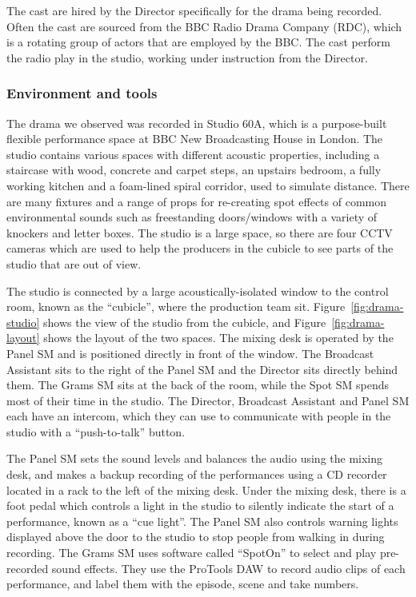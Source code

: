 The cast are hired by the Director specifically for the drama being recorded. Often the cast are sourced from the BBC
Radio Drama Company (RDC), which is a rotating group of actors that are employed by the BBC. The cast perform the
radio play in the studio, working under instruction from the Director.

\subsubsection{Environment and tools}
The drama we observed was recorded in Studio 60A, which is a purpose-built flexible performance space at BBC New
Broadcasting House in London. The studio contains various spaces with different acoustic properties, including a
staircase with wood, concrete and carpet steps, an upstairs bedroom, a fully working kitchen and a foam-lined spiral
corridor, used to simulate distance.  There are many fixtures and a range of props for re-creating spot effects of
common environmental sounds such as freestanding doors/windows with a variety of knockers and letter boxes. The studio
is a large space, so there are four CCTV cameras which are used to help the producers in the cubicle to see parts of
the studio that are out of view. 

The studio is connected by a large acoustically-isolated window to the control room, known as the ``cubicle'', where
the production team sit.  Figure~\ref{fig:drama-studio} shows the view of the studio from the cubicle, and
Figure~\ref{fig:drama-layout} shows the layout of the two spaces. The mixing desk is operated by the Panel SM and is
positioned directly in front of the window.  The Broadcast Assistant sits to the right of the Panel SM and the Director
sits directly behind them. The Grams SM sits at the back of the room, while the Spot SM spends most of their time in
the studio.  The Director, Broadcast Assistant and Panel SM each have an intercom, which they can use to communicate
with people in the studio with a ``push-to-talk'' button.

The Panel SM sets the sound levels and balances the audio using the mixing desk, and makes a backup recording of the
performances using a CD recorder located in a rack to the left of the mixing desk.  Under the mixing desk, there is a
foot pedal which controls a light in the studio to silently indicate the start of a performance, known as a ``cue
light''. The Panel SM also controls warning lights displayed above the door to the studio to stop people from walking
in during recording.  The Grams SM uses software called ``SpotOn'' \citep{Cridford2005} to select and play pre-recorded
sound effects. They use the ProTools DAW to record audio clips of each performance, and label them with the episode,
scene and take numbers.

